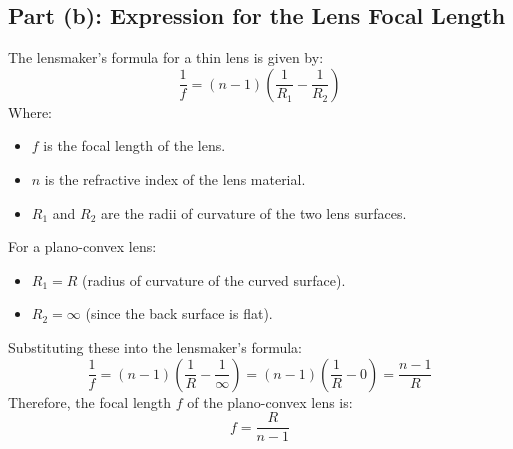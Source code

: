 \documentclass[a4paper]{article}
\begin{document}
\subsection*{Part (b): Expression for the Lens Focal Length}

The lensmaker's formula for a thin lens is given by:
\[
\frac{1}{f} = (n - 1) \left( \frac{1}{R_1} - \frac{1}{R_2} \right)
\]
Where:
\begin{itemize}
    \item \( f \) is the focal length of the lens.
    \item \( n \) is the refractive index of the lens material.
    \item \( R_1 \) and \( R_2 \) are the radii of curvature of the two lens surfaces.
\end{itemize}

For a plano-convex lens:
\begin{itemize}
    \item \( R_1 = R \) (radius of curvature of the curved surface).
    \item \( R_2 = \infty \) (since the back surface is flat).
\end{itemize}

Substituting these into the lensmaker's formula:
\[
\frac{1}{f} = (n - 1) \left( \frac{1}{R} - \frac{1}{\infty} \right) = (n - 1) \left( \frac{1}{R} - 0 \right) = \frac{n - 1}{R}
\]
Therefore, the focal length \( f \) of the plano-convex lens is:
\[
f = \frac{R}{n - 1}
\] 
\end{document}
